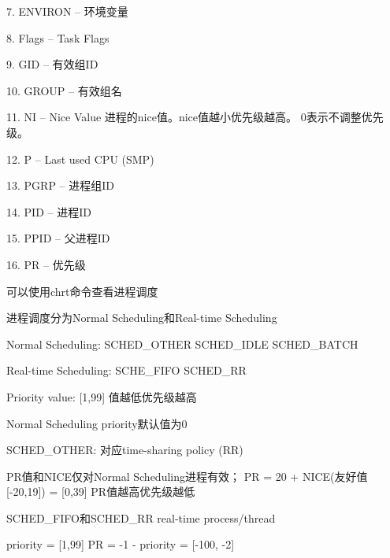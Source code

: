 7. ENVIRON  --  环境变量   \par

8. Flags  --  Task Flags    \par
{}

9. GID  --  有效组ID \par

10. GROUP  --  有效组名 \par

11. NI  --  Nice Value 进程的nice值。nice值越小优先级越高。 0表示不调整优先级。  \par

12. P  --  Last used CPU (SMP)  \par
{}

13. PGRP  --  进程组ID  \par

14. PID  --  进程ID \par

15. PPID  --  父进程ID \par

16. PR  --  优先级   \par
可以使用chrt命令查看进程调度

进程调度分为Normal Scheduling和Real-time Scheduling

Normal Scheduling: SCHED\_OTHER      SCHED\_IDLE   SCHED\_BATCH

Real-time Scheduling: SCHE\_FIFO     SCHED\_RR

Priority value: [1,99] 值越低优先级越高

Normal Scheduling priority默认值为0

SCHED\_OTHER: 对应time-sharing policy (RR)

PR值和NICE仅对Normal Scheduling进程有效；
PR = 20 + NICE(友好值[-20,19]) = [0,39] PR值越高优先级越低

SCHED\_FIFO和SCHED\_RR  real-time process/thread

priority = [1,99]
PR = -1 - priority = [-100, -2]


